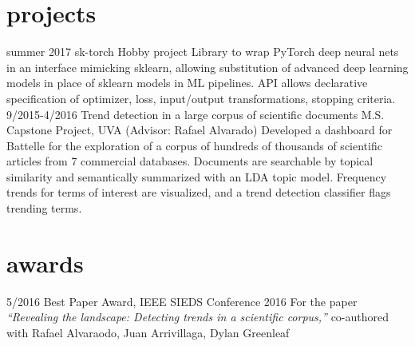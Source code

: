 \documentclass[letterpaper,10pt]{hawthorn-resume}
\begin{document}
\begin{body}
\section{projects}
\begin{entrylist}
  \projectentry
    {summer 2017}
    {sk-torch}
    {Hobby project}
    {Library to wrap PyTorch deep neural nets in an interface mimicking sklearn, allowing substitution of advanced deep learning models in place of sklearn models in ML pipelines. API allows declarative specification of optimizer, loss, input/output transformations, stopping criteria.}
  \projectentry
    {9/2015-4/2016}
    {Trend detection in a large corpus of scientific documents}
    {M.S. Capstone Project, UVA (Advisor: Rafael Alvarado)}
    {Developed a dashboard for Battelle for the exploration of a
corpus of hundreds of thousands of scientific articles from 7 commercial databases.  
Documents are searchable by topical similarity and semantically summarized with an LDA topic model.
Frequency trends for terms of interest are visualized, and a trend detection classifier flags trending terms.}
\end{entrylist}

\section{awards}
\begin{entrylist}
 \awardentry
   {5/2016}
   {Best Paper Award, IEEE SIEDS Conference 2016}
   {For the paper \emph{``Revealing the landscape: Detecting trends in a scientific corpus,''} co-authored with Rafael Alvaraodo, Juan Arrivillaga, Dylan Greenleaf}
\end{entrylist}
\end{body}
\end{document}
